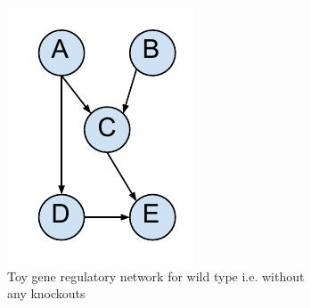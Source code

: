 \begin{figure}
    \centering
    \begin{subfigure}[b]{0.3\textwidth}
        \includegraphics[width=\textwidth]{images/Graph_to_explain_gene_knockout.pdf}
        \caption{ Toy gene regulatory network for wild type i.e. without any knockouts }
        \label{fig:pre_knockout}
    \end{subfigure}
    \begin{subfigure}[b]{0.3\textwidth}

\end{subfigure}
\end{figure}
